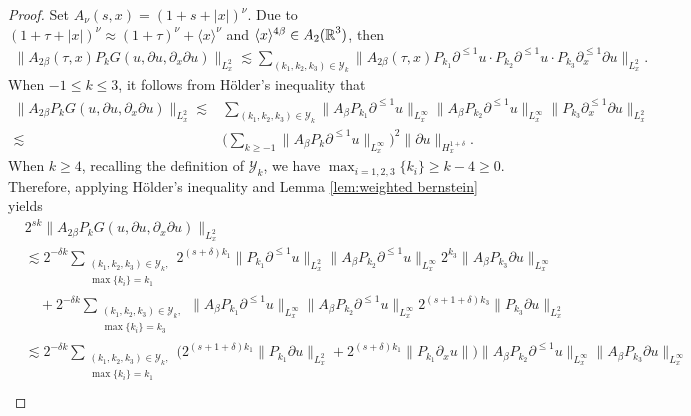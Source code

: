 \documentclass[11pt,twoside]{article}
\def\cY{\mathcal Y}
\def\R{\mathop{\mathbb R\kern 0pt}\nolimits}
\def\p{\partial}
\def\ls{\lesssim}
\newcommand{\w}[1]{\langle {#1} \rangle}
\theoremstyle{plain}
\theoremstyle{definition}
\numberwithin{equation}{section}
\begin{document}
\begin{proof}
	Set $A_\nu(s,x)=(1+s+|x|)^{\nu}$.	Due to $(1+\tau+|x|)^{\nu}\approx(1+\tau)^{\nu}+\w{x}^{\nu}$ and
$\w{x}^{4\beta}\in A_2(\R^3)$, then
	\begin{equation}\label{3.39}
		\begin{split}
			\|A_{2\beta}(\tau,x)P_k G(u,\p u,\p_x\p u)\|_{L^2_x}
			\ls
			\sum_{(k_1,k_2,k_3)\in \cY_k}\|A_{2\beta}(\tau,x)P_{k_1}\p^{\le 1} u\cdot P_{k_2}\p^{\le 1} u\cdot P_{k_3}\p_x^{\le 1}\p u\|_{L^2_x}.
		\end{split}	
	\end{equation}
When $-1\le k \le 3$, it follows from H\"older's inequality that
	\begin{equation}\label{3.98}
		\begin{split}
			\|A_{2\beta}P_k G(u,\partial u,\p_x\p u)\|_{L^2_x}
			\ls
			&
			\sum_{(k_1,k_2,k_3)\in\cY_k} \|A_{\beta}P_{k_1}\p^{\le 1} u\|_{L^\infty_x} \|A_{\beta}P_{k_2}\p^{\le 1} u\|_{L^\infty_x} \|P_{k_3}\p_x^{\le 1}\p u\|_{L^2_x}\\
			\ls&
			\big(\sum_{k\ge-1} \|A_{\beta}P_{k}\p^{\le 1} u\|_{L^\infty_x}\big)^2
			\|\p u\|_{H^{1+\delta}_x}.
		\end{split}
	\end{equation}
When $k\ge 4$, recalling the definition of $\cY_k$, we have $\max_{i=1,2,3}\{k_i\}\ge k-4\ge 0$.
Therefore, applying H\"older's inequality and Lemma \ref{lem:weighted bernstein} yields
\begin{equation}\label{3.99}
\begin{split}
&2^{sk}\|A_{2\beta}P_k G(u,\partial u,\p_x\p u)\|_{L^2_x}\\
&\ls
2^{-\delta k}\sum_{\substack{(k_1,k_2,k_3)\in\cY_k, \\ \max\{k_i\}=k_1}} 2^{(s+\delta)k_1 }\|P_{k_1}\p^{\le 1} u\|_{L^2_x} \|A_{\beta}P_{k_2}\p^{\le 1} u\|_{L^\infty_x} 2^{k_3}\|A_\beta P_{k_3}\p u\|_{L^\infty_x}\\
&\quad+2^{-\delta k}\sum_{\substack{(k_1,k_2,k_3)\in\cY_k, \\ \max\{k_i\}=k_3}} \|A_{\beta}P_{k_1}\p^{\le 1} u\|_{L^\infty_x} \|A_{\beta}P_{k_2}\p^{\le 1} u\|_{L^\infty_x} 2^{(s+1+\delta)k_3}\|P_{k_3}\p u\|_{L^2_x}\\
&\ls
2^{-\delta k}\sum_{\substack{(k_1,k_2,k_3)\in\cY_k, \\ \max\{k_i\}=k_1}} \big(2^{(s+1+\delta)k_1 }\|P_{k_1}\p u\|_{L^2_x}+2^{(s+\delta)k_1 }\|P_{k_1}\p_x u\|\big) \|A_{\beta}P_{k_2}\p^{\le 1} u\|_{L^\infty_x} \|A_\beta P_{k_3}\p u\|_{L^\infty_x}\\

\end{split}
\end{equation}
\end{proof}
\end{document}
